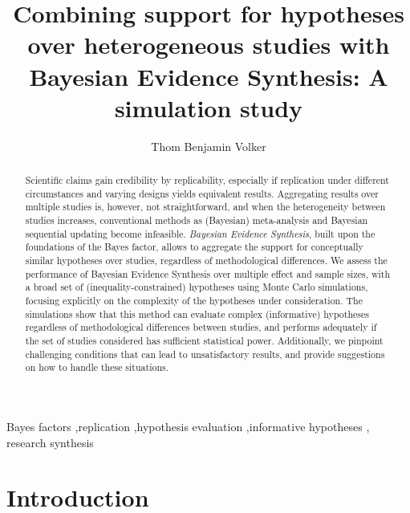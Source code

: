 \documentclass[review, 3p, authoryear]{elsarticle} %
\begin{document}
\begin{frontmatter}

  \title{Combining support for hypotheses over heterogeneous studies with Bayesian Evidence Synthesis: A simulation study}
    \author[Utrecht University]{Thom Benjamin Volker%
  }
  
  \begin{abstract}
  Scientific claims gain credibility by replicability, especially if replication under different circumstances and varying designs yields equivalent results. Aggregating results over multiple studies is, however, not straightforward, and when the heterogeneity between studies increases, conventional methods as (Bayesian) meta-analysis and Bayesian sequential updating become infeasible. \emph{Bayesian Evidence Synthesis}, built upon the foundations of the Bayes factor, allows to aggregate the support for conceptually similar hypotheses over studies, regardless of methodological differences. We assess the performance of Bayesian Evidence Synthesis over multiple effect and sample sizes, with a broad set of (inequality-constrained) hypotheses using Monte Carlo simulations, focusing explicitly on the complexity of the hypotheses under consideration. The simulations show that this method can evaluate complex (informative) hypotheses regardless of methodological differences between studies, and performs adequately if the set of studies considered has sufficient statistical power. Additionally, we pinpoint challenging conditions that can lead to unsatisfactory results, and provide suggestions on how to handle these situations.
  \end{abstract}
    \begin{keyword}
    Bayes factors \sep replication \sep hypothesis evaluation \sep informative hypotheses \sep 
    research synthesis
  \end{keyword}
  
 \end{frontmatter}


\hypertarget{introduction}{%
\section{Introduction}\label{introduction}}
\end{document}
